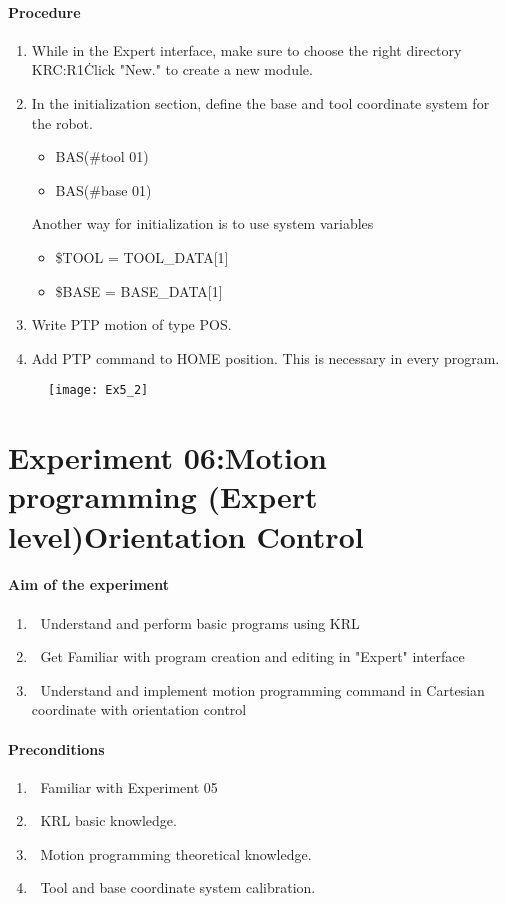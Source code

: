 \documentclass[]{book}
\begin{document}
\paragraph{Procedure}
\begin{enumerate}
	\item While in the Expert interface, make sure to choose the right directory KRC:R1\.Click "New." to create a new module.
	\item In the initialization section, define the base and tool coordinate system for the robot.
	\begin{itemize}
	\item BAS(\#tool 01)
	\item BAS(\#base 01)
\end{itemize}
Another way for initialization is to use system variables
\begin{itemize} 
	\item \$TOOL = TOOL\_DATA[1]
	\item \$BASE = BASE\_DATA[1]
\end{itemize}
\item Write PTP motion of type POS.
\item Add PTP command to HOME position. This is necessary in every program.
\end{enumerate}
\begin{figure}[H]
	\centering
	\texttt{[image: Ex5\_2]}
\end{figure}
\section{Experiment 06:Motion programming (Expert level)Orientation Control}
\paragraph{Aim of the experiment}
\begin{enumerate}
	\item 	Understand and perform basic programs using KRL
	\item 	Get Familiar with program creation and editing in "Expert" interface
	\item 	Understand and implement motion programming command in Cartesian coordinate with orientation control
\end{enumerate}
\paragraph{Preconditions}
\begin{enumerate}
	\item 	Familiar with Experiment 05
	\item 	KRL basic knowledge.
	\item 	Motion programming theoretical knowledge. 
	\item 	Tool and base coordinate system calibration.
\end{enumerate}
\end{document}

